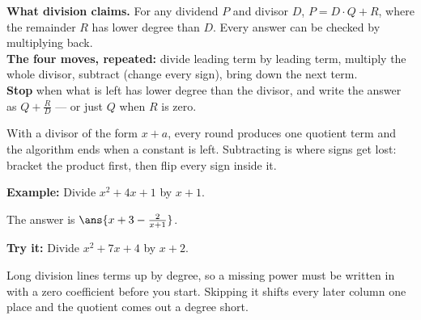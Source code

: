 \documentclass[12pt]{article}
\begin{document}

\begin{formulabox}
\textbf{What division claims.} For any dividend $P$ and divisor $D$,
$P = D \cdot Q + R$, where the remainder $R$ has lower degree than $D$. Every
answer can be checked by multiplying back.\\[3pt]
\textbf{The four moves, repeated:} divide leading term by leading term,
multiply the whole divisor, subtract (change every sign), bring down the next
term.\\[3pt]
\textbf{Stop} when what is left has lower degree than the divisor, and write
the answer as $Q + \frac{R}{D}$ --- or just $Q$ when $R$ is zero.
\end{formulabox}


\begin{formulabox}
With a divisor of the form $x + a$, every round produces one quotient term and
the algorithm ends when a constant is left. Subtracting is where signs get
lost: bracket the product first, then flip every sign inside it.
\end{formulabox}

\begin{examplebox}
\textbf{Example:} Divide $x^2 + 4x + 1$ by $x + 1$.

The answer is $\ans{x + 3 - \frac{2}{x + 1}}$.
\end{examplebox}

\begin{tryitbox}
\textbf{Try it:} Divide $x^2 + 7x + 4$ by $x + 2$.\\[2pt]
\end{tryitbox}


\begin{formulabox}
Long division lines terms up by degree, so a missing power must be written in
with a zero coefficient before you start. Skipping it shifts every later
column one place and the quotient comes out a degree short.
\end{formulabox}
\end{document}
